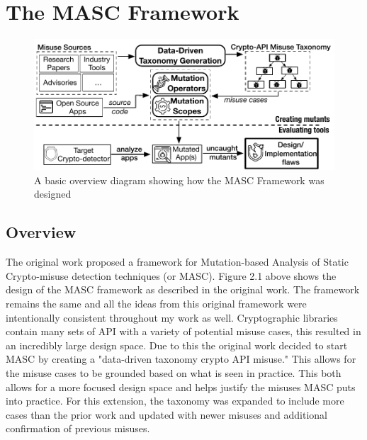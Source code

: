 \chapter{The MASC Framework}
\label{chap_framework}
\begin{figure}[!ht]
	\centering
    \includegraphics[width=0.96\linewidth]{figures/overview.pdf}
	\vspace{-1.em}
    \caption{\small A basic overview diagram showing how the MASC Framework was designed}
    \label{fig:overview}
	
\end{figure}
\section{Overview}
\label{ch2:sec:overview}

The original work proposed a framework for Mutation-based Analysis of Static Crypto-misuse detection techniques (or MASC). Figure 2.1 above shows the design of the MASC framework as described in the original work. The framework remains the same and all the ideas from this original framework were intentionally consistent throughout my work as well. Cryptographic libraries contain many sets of API with a variety of potential misuse cases, this resulted in an incredibly large design space. Due to this the original work decided to start MASC by creating a "data-driven taxonomy crypto API misuse." This allows for the misuse cases to be grounded based on what is seen in practice. This both allows for a more focused design space and helps justify the misuses MASC puts into practice. For this extension, the taxonomy was expanded to include more cases than the prior work and updated with newer misuses and additional confirmation of previous misuses.

